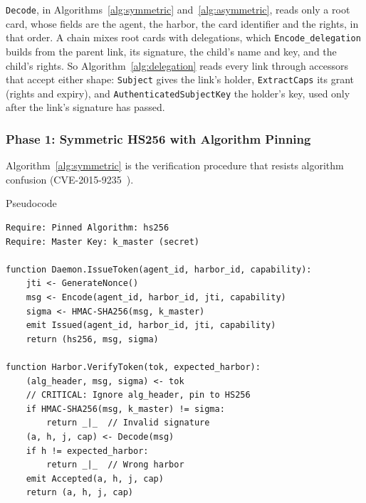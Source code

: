 \documentclass[11pt,a4paper]{article}
\theoremstyle{definition}
\begin{document}
\texttt{Decode}, in Algorithms~\ref{alg:symmetric} and~\ref{alg:asymmetric},
reads only a root card, whose fields are the agent, the harbor, the card
identifier and the rights, in that order. A chain mixes root cards with
delegations, which \texttt{Encode\_delegation} builds from the parent link,
its signature, the child's name and key, and the child's rights. So
Algorithm~\ref{alg:delegation} reads every link through accessors that accept
either shape: \texttt{Subject} gives the link's holder, \texttt{ExtractCaps}
its grant (rights and expiry), and \texttt{AuthenticatedSubjectKey} the
holder's key, used only after the link's signature has passed.

\subsubsection{Phase 1: Symmetric HS256 with Algorithm Pinning}

Algorithm~\ref{alg:symmetric} is the verification procedure that resists algorithm confusion (CVE-2015-9235~).

\begin{pdlisting}{Pseudocode}{}
\begin{lstlisting}[style=pseudocode,caption={Algorithm 1: Secure Harbor Verification (HS256 with Algorithm Pinning)},label={alg:symmetric}]
Require: Pinned Algorithm: hs256
Require: Master Key: k_master (secret)

function Daemon.IssueToken(agent_id, harbor_id, capability):
    jti <- GenerateNonce()
    msg <- Encode(agent_id, harbor_id, jti, capability)
    sigma <- HMAC-SHA256(msg, k_master)
    emit Issued(agent_id, harbor_id, jti, capability)
    return (hs256, msg, sigma)

function Harbor.VerifyToken(tok, expected_harbor):
    (alg_header, msg, sigma) <- tok
    // CRITICAL: Ignore alg_header, pin to HS256
    if HMAC-SHA256(msg, k_master) != sigma:
        return _|_  // Invalid signature
    (a, h, j, cap) <- Decode(msg)
    if h != expected_harbor:
        return _|_  // Wrong harbor
    emit Accepted(a, h, j, cap)
    return (a, h, j, cap)
\end{lstlisting}
\end{pdlisting}
\end{document}

